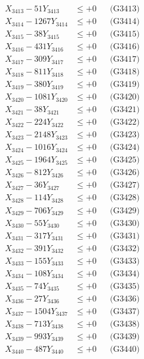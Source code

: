 \documentclass[a4paper,10pt]{article}
\begin{document}
{\begin{align}
X_{3413} - 51Y_{3413} &\leq +0 && \text{(G3413)} \\
X_{3414} - 1267Y_{3414} &\leq +0 && \text{(G3414)} \\
X_{3415} - 38Y_{3415} &\leq +0 && \text{(G3415)} \\
X_{3416} - 431Y_{3416} &\leq +0 && \text{(G3416)} \\
X_{3417} - 309Y_{3417} &\leq +0 && \text{(G3417)} \\
X_{3418} - 811Y_{3418} &\leq +0 && \text{(G3418)} \\
X_{3419} - 380Y_{3419} &\leq +0 && \text{(G3419)} \\
X_{3420} - 1081Y_{3420} &\leq +0 && \text{(G3420)} \\
\allowbreak
X_{3421} - 38Y_{3421} &\leq +0 && \text{(G3421)} \\
X_{3422} - 224Y_{3422} &\leq +0 && \text{(G3422)} \\
X_{3423} - 2148Y_{3423} &\leq +0 && \text{(G3423)} \\
X_{3424} - 1016Y_{3424} &\leq +0 && \text{(G3424)} \\
X_{3425} - 1964Y_{3425} &\leq +0 && \text{(G3425)} \\
X_{3426} - 812Y_{3426} &\leq +0 && \text{(G3426)} \\
X_{3427} - 36Y_{3427} &\leq +0 && \text{(G3427)} \\
X_{3428} - 114Y_{3428} &\leq +0 && \text{(G3428)} \\
X_{3429} - 706Y_{3429} &\leq +0 && \text{(G3429)} \\
X_{3430} - 55Y_{3430} &\leq +0 && \text{(G3430)} \\
\allowbreak
X_{3431} - 317Y_{3431} &\leq +0 && \text{(G3431)} \\
X_{3432} - 391Y_{3432} &\leq +0 && \text{(G3432)} \\
X_{3433} - 155Y_{3433} &\leq +0 && \text{(G3433)} \\
X_{3434} - 108Y_{3434} &\leq +0 && \text{(G3434)} \\
X_{3435} - 74Y_{3435} &\leq +0 && \text{(G3435)} \\
X_{3436} - 27Y_{3436} &\leq +0 && \text{(G3436)} \\
X_{3437} - 1504Y_{3437} &\leq +0 && \text{(G3437)} \\
X_{3438} - 713Y_{3438} &\leq +0 && \text{(G3438)} \\
X_{3439} - 993Y_{3439} &\leq +0 && \text{(G3439)} \\
X_{3440} - 487Y_{3440} &\leq +0 && \text{(G3440)} \\

\end{align}}
\end{document}
